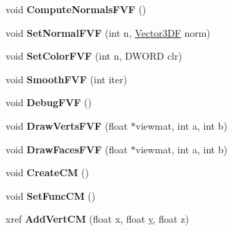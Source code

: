 \begin{DoxyCompactItemize}
\item 
\hypertarget{class_mesh_a4e9db55d9919eeb454924f54cd05deb0}{void {\bfseries Compute\+Normals\+F\+V\+F} ()}\label{class_mesh_a4e9db55d9919eeb454924f54cd05deb0}

\item 
\hypertarget{class_mesh_ae8c8263c197590a69405ba8e531f75d4}{void {\bfseries Set\+Normal\+F\+V\+F} (int n, \hyperlink{class_vector3_d_f}{Vector3\+D\+F} norm)}\label{class_mesh_ae8c8263c197590a69405ba8e531f75d4}

\item 
\hypertarget{class_mesh_aa29d8599d3c5a4b7e32d91107a9bad85}{void {\bfseries Set\+Color\+F\+V\+F} (int n, D\+W\+O\+R\+D clr)}\label{class_mesh_aa29d8599d3c5a4b7e32d91107a9bad85}

\item 
\hypertarget{class_mesh_af14a53cc17d69b360a25881ffc781dd3}{void {\bfseries Smooth\+F\+V\+F} (int iter)}\label{class_mesh_af14a53cc17d69b360a25881ffc781dd3}

\item 
\hypertarget{class_mesh_a781f9d5c3c9b5377736064f31799193b}{void {\bfseries Debug\+F\+V\+F} ()}\label{class_mesh_a781f9d5c3c9b5377736064f31799193b}

\item 
\hypertarget{class_mesh_a04c96e74fef2a46f4d6cfd1dc4bcf9a3}{void {\bfseries Draw\+Verts\+F\+V\+F} (float $\ast$viewmat, int a, int b)}\label{class_mesh_a04c96e74fef2a46f4d6cfd1dc4bcf9a3}

\item 
\hypertarget{class_mesh_a80bce4c24bffbffdb11092281890615a}{void {\bfseries Draw\+Faces\+F\+V\+F} (float $\ast$viewmat, int a, int b)}\label{class_mesh_a80bce4c24bffbffdb11092281890615a}

\item 
\hypertarget{class_mesh_a638ee216892d9ad383604a6b8ed17d5e}{void {\bfseries Create\+C\+M} ()}\label{class_mesh_a638ee216892d9ad383604a6b8ed17d5e}

\item 
\hypertarget{class_mesh_abbf57cc8e507e2d9b741434e5422b6c6}{void {\bfseries Set\+Func\+C\+M} ()}\label{class_mesh_abbf57cc8e507e2d9b741434e5422b6c6}

\item 
\hypertarget{class_mesh_ab93dab79f1c9362a4f6b38bdad0370d5}{xref {\bfseries Add\+Vert\+C\+M} (float x, float \hyperlink{_ice_utils_8h_aa7ffaed69623192258fb8679569ff9ba}{y}, float z)}\label{class_mesh_ab93dab79f1c9362a4f6b38bdad0370d5}


\end{DoxyCompactItemize}
